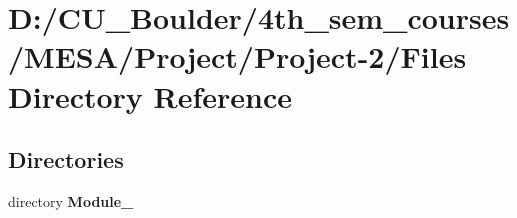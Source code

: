 \section{D\+:/\+C\+U\+\_\+\+Boulder/4th\+\_\+sem\+\_\+courses/\+M\+E\+S\+A/\+Project/\+Project-\/2/\+Files Directory Reference}
\label{dir_b33e68808cb05066800897d19ce9e80c}
\subsection*{Directories}
\begin{DoxyCompactItemize}
\item 
directory \textbf{ Module\+\_}
\end{DoxyCompactItemize}
